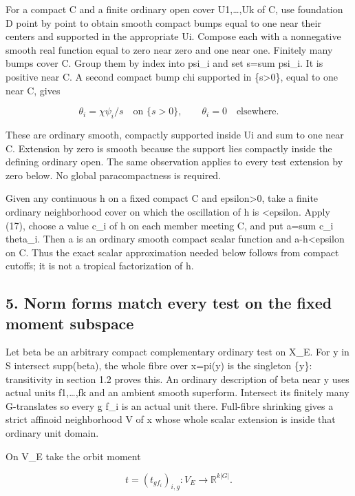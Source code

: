 \documentclass[
  10pt,
]{article}
\begin{document}
For a compact C and a finite ordinary open cover U1,\ldots,Uk of C, use
foundation D point by point to obtain smooth compact bumps equal to one
near their centers and supported in the appropriate Ui. Compose each
with a nonnegative smooth real function equal to zero near zero and one
near one. Finitely many bumps cover C. Group them by index into psi\_i
and set s=sum psi\_i. It is positive near C. A second compact bump chi
supported in \{s\textgreater0\}, equal to one near C, gives

\[
 \theta_i=\chi\psi_i/s\quad\text{on }\{s>0\},
 \qquad \theta_i=0\quad\text{elsewhere}.                    \tag{17}
\]

These are ordinary smooth, compactly supported inside Ui and sum to one
near C. Extension by zero is smooth because the support lies compactly
inside the defining ordinary open. The same observation applies to every
test extension by zero below. No global paracompactness is required.

Given any continuous h on a fixed compact C and epsilon\textgreater0,
take a finite ordinary neighborhood cover on which the oscillation of h
is \textless epsilon. Apply (17), choose a value c\_i of h on each
member meeting C, and put a=sum c\_i theta\_i. Then a is an ordinary
smooth compact scalar function and \textbar a-h\textbar\textless epsilon
on C. Thus the exact scalar approximation needed below follows from
compact cutoffs; it is not a tropical factorization of h.

\subsection{5. Norm forms match every test on the fixed moment
subspace}\label{norm-forms-match-every-test-on-the-fixed-moment-subspace}

Let beta be an arbitrary compact complementary ordinary test on X\_E.
For y in S intersect supp(beta), the whole fibre over x=pi(y) is the
singleton \{y\}: transitivity in section 1.2 proves this. An ordinary
description of beta near y uses actual units f1,\ldots,fk and an ambient
smooth superform. Intersect its finitely many G-translates so every g
f\_i is an actual unit there. Full-fibre shrinking gives a strict
affinoid neighborhood V of x whose whole scalar extension is inside that
ordinary unit domain.

On V\_E take the orbit moment

\[
 t=(t_{g f_i})_{i,g}: V_E\longrightarrow\mathbb{R}^{k|G|}.
\]
\end{document}
